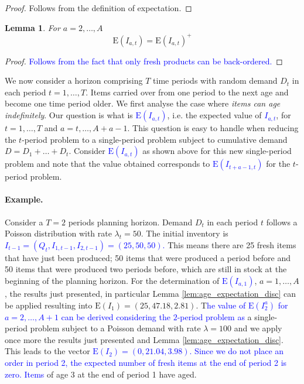 \documentclass{tPRS2e}
\newcommand{\blue}{\textcolor{blue}}
\newtheorem{lem}{Lemma}
\begin{document}
	\begin{proof}
		Follows from the definition of expectation.
	\end{proof}
%	
	\begin{lem}
		For $a=2,\ldots,A$
		\[\mathrm{E}(I_{a,t})=\mathrm{E}(I_{a,t})^+\]
	\end{lem}
	\begin{proof}
		\blue{Follows from the fact that only fresh products can be back-ordered.} 
	\end{proof}
%	
We now consider a horizon comprising $T$ time periods with random demand $D_t$ in each period $t=1,\ldots,T$. Items carried over from one period to the next age and become one time period older. We first analyse the case where {\em items can age indefinitely}. Our question is what is \blue{$\mathrm{E}(I_{a,t})$}, i.e. the expected value of \blue{$I_{a,t}$}, for $t=1,\ldots,T$ and $a=t,\ldots,A+a-1$. This question is easy to handle when reducing the $t$-period problem to a single-period problem subject to cumulative demand $D=D_1+\ldots+D_t$. Consider \blue{$\mathrm{E}(I_{a,t})$} as shown above for this new single-period problem and  note that the value obtained corresponds to \blue{$\mathrm{E}(I_{t+a-1,t})$} for the $t$-period problem.
	
\paragraph*{\bf Example.} Consider a $T=2$ periods planning horizon. Demand $D_t$ in each period $t$ follows a Poisson distribution with rate $\lambda_t=50$. The initial inventory is \blue{$I_{t-1}=(Q_t, I_{1,t-1}, I_{2,t-1})=(25,50,50)$.} This means there are 25 fresh items that have just been produced; 50 items that were produced a period before and 50 items that were produced two periods before, which are still in stock at the beginning of the planning horizon. For the determination of \blue{$\mathrm{E}(I_{a,1})$}, $a=1,\ldots,A$, the results just presented, in particular Lemma \ref{lem:age_expectation_disc} can be applied resulting into $\mathrm{E}(I_1)=(25, 47.18, 2.81)$. T\blue{he value of $\mathrm{E}(I^a_2)$ for $a=2,\ldots,A+1$ can be derived considering the $2$-period problem as} a single-period problem subject to a Poisson demand with rate $\lambda=100$ and we apply once more the results just presented and Lemma \ref{lem:age_expectation_disc}. This leads to the vector \blue{$\mathrm{E}(I_2)=(0, 21.04, 3.98)$. Since we do not place an order in period 2, the expected number of fresh items at the end of period 2 is zero. Items} of age 3 at the end of period 1 have aged.
	
\end{document}
